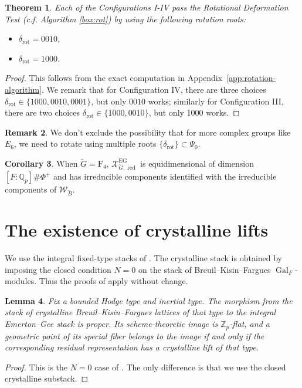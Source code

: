 \documentclass[11pt]{amsart}
\newcommand{\MINOREDITED}[1]{#1}
\newtheorem{thm}{Theorem}[section]
\newtheorem{lem}[thm]{Lemma}
\theoremstyle{definition}
\newtheorem{cor}[thm]{Corollary}
\newtheorem{remark}[thm]{Remark}
\newcommand{\Z}{\mathbb{Z}}
\newcommand{\Q}{\mathbb{Q}}
\newcommand{\rot}{{\operatorname{rot}}}
\newcommand{\cX}{\mathcal{X}}
\newcommand{\cW}{\mathcal{W}}
\newcommand{\bG}{\breve{G}}
\newcommand{\bB}{\breve{B}}
\DeclareMathOperator{\EG}{EG}
\DeclareMathOperator{\red}{red}
\DeclareMathOperator{\Gal}{Gal}
\begin{document}
\begin{thm}
\label{thm:ht1-codim0}
\rm
Each of the Configurations I-IV pass the Rotational Deformation Test
(c.f. Algorithm \ref{box:rot})
by using the following rotation roots:
\begin{itemize}
\item[(I, II, IV)] $\delta_\rot=0010$,
\item[(III)] $\delta_\rot=1000$.
\end{itemize}
\end{thm}

\begin{proof}
This follows from the exact computation in
Appendix~\ref{app:rotation-algorithm}.
We remark that for Configuration IV, there are three choices
$\delta_\rot\in\{1000,0010,0001\}$,
but only $0010$ works;
similarly for \MINOREDITED{Configuration} III, there are two choices
$\delta_\rot\in\{1000,0010\}$,
but only $1000$ works.
\end{proof}

\begin{remark}
We don't exclude the possibility that
for more complex groups like $E_6$,
we need to rotate using multiple roots
$\{\delta_{\rot}\}\subset \Psi_0$.
\end{remark}

\begin{cor}
When $\bG=\mathrm{F}_4$,
$\cX_{\bG,\red}^{\EG}$
is equidimensional of dimension
$[F:\Q_p]\#\Phi^+$
and has irreducible components identified
with
the irreducible components
of $\cW_{\bB}$.
\label{cor:F4-equidim}
\end{cor}

\section{The existence of crystalline lifts}

We use the integral fixed-type stacks of \cite{Lin25}.
The crystalline stack is obtained by imposing the closed condition $N=0$
on the stack of Breuil--Kisin--Fargues $\Gal_F$-modules.
Thus the proofs of
\cite[Proposition B.5.10 and Theorem B.6.3]{Lin25}
apply without change.

\begin{lem}
\label{lem:crystalline-proper-image}
Fix a bounded Hodge type and inertial type.  The morphism from the stack of
crystalline Breuil--Kisin--Fargues lattices of that type to the integral
Emerton--Gee stack is proper.  Its scheme-theoretic image is
$\Z_p$-flat, and a geometric point of its special fiber belongs to the image
if and only if the corresponding residual representation has a crystalline
lift of that type.
\end{lem}
\begin{proof}
This is the $N=0$ case of
\cite[Proposition B.5.10 and Theorem B.6.3]{Lin25}.
The only difference is that we use the closed crystalline substack.
\end{proof}
\end{document}
